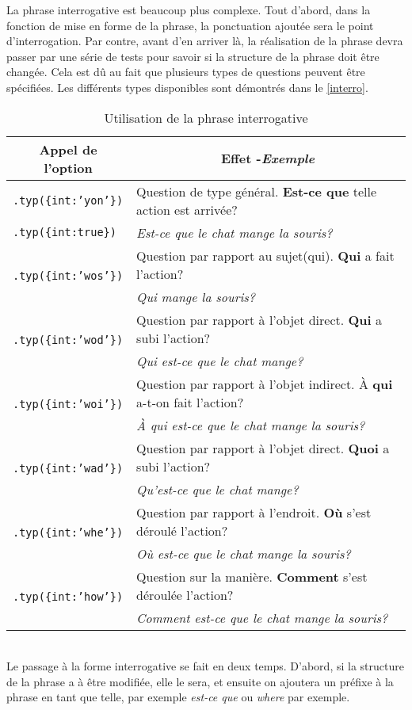 \documentclass[11pt]{article} %
\newcommand{\real}[1]{\emph{#1}}
\begin{document}
La phrase interrogative est beaucoup plus complexe.
Tout d'abord, dans la fonction de mise en forme de la phrase, la
ponctuation ajoutée sera le point d'interrogation. Par contre, avant
d'en arriver là, la réalisation de la phrase devra passer par une
série de tests pour savoir si la structure de la phrase doit être
changée. Cela est dû au fait que plusieurs types de questions peuvent
être spécifiées. Les différents types disponibles sont démontrés 
dans le \autoref{interro}.
\begin{table}[ht]
\caption{Utilisation de la phrase interrogative}
\begin{tabular}{|l|l|}
\hline 
\multicolumn{1}{|c}{Appel de l'option} & \multicolumn{1}{|c|}{Effet -\small{\real{Exemple}}}\\
\hline 
\hline 
\texttt{.typ(\{int:'yon'\})} & Question de type général.\textbf{ Est-ce que} telle action est arrivée? \\
\texttt{.typ(\{int:true\})} & \small{\real{Est-ce que le chat mange la souris?}}\\
\hline
\multirow{2}{*}{\texttt{.typ(\{int:'wos'\})}} & Question par rapport au sujet(qui). \textbf{Qui} a fait l'action?\\
& \small{\real{Qui mange la souris?}}\\ \hline
\multirow{2}{*}{\texttt{.typ(\{int:'wod'\})}} & Question par rapport à l'objet direct. \textbf{Qui} a subi l'action?\\
& \small{\real{Qui est-ce que le chat mange?}}\\
\hline 
\multirow{2}{*}{\texttt{.typ(\{int:'woi'\})}} & Question par rapport à l'objet indirect. À \textbf{qui} a-t-on fait
l'action?\\
&\small{\real{À qui est-ce que le chat mange la souris?}}\\
\hline 
\multirow{2}{*}{\texttt{.typ(\{int:'wad'\})}} & Question par rapport à l'objet direct. \textbf{Quoi} a subi l'action?\\
&\small{\real{Qu'est-ce que le chat mange?}} \\ \hline 
\multirow{2}{*}{\texttt{.typ(\{int:'whe'\})}} & Question par rapport à l'endroit. \textbf{Où }s'est déroulé l'action?\\
& \small{\real{Où est-ce que le chat mange la souris?}} \\ \hline 
\multirow{2}{*}{\texttt{.typ(\{int:'how'\})}} & Question sur la manière. \textbf{Comment }s'est déroulée l'action?\\
& \small{\real{Comment est-ce que le chat mange la souris?}} \\ \hline 
\end{tabular}
\label{interro}
\end{table}
\\
Le passage à la forme interrogative se fait en deux temps. D'abord,
si la structure de la phrase a à être modifiée, elle le sera, et ensuite
on ajoutera un préfixe à la phrase en tant que telle, par exemple
\emph{est-ce que }ou \emph{where} par exemple.
\end{document}
